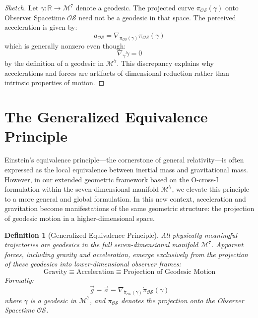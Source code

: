 \documentclass{article}
\newtheorem{definition}{Definition}
\begin{document}
\begin{proof}[Sketch]
Let $\gamma: \mathbb{R} \to \mathcal{M}^7$ denote a geodesic. The projected curve $\pi_{\mathcal{OS}}(\gamma)$ onto Observer Spacetime $\mathcal{OS}$ need not be a geodesic in that space. The perceived acceleration is given by:
\begin{equation}
a_{\mathcal{OS}} = \nabla_{\dot{\pi}_{\mathcal{OS}}(\gamma)}\dot{\pi}_{\mathcal{OS}}(\gamma)
\end{equation}
which is generally nonzero even though:
\begin{equation}
\nabla_{\dot{\gamma}}\dot{\gamma} = 0
\end{equation}
by the definition of a geodesic in $\mathcal{M}^7$. This discrepancy explains why accelerations and forces are artifacts of dimensional reduction rather than intrinsic properties of motion.
\end{proof}




\section{The Generalized Equivalence Principle}

Einstein's equivalence principle—the cornerstone of general relativity—is often expressed as the local equivalence between inertial mass and gravitational mass. However, in our extended geometric framework based on the O-cross-I formulation within the seven-dimensional manifold $\mathcal{M}^7$, we elevate this principle to a more general and global formulation. In this new context, acceleration and gravitation become manifestations of the same geometric structure: the projection of geodesic motion in a higher-dimensional space.

\begin{definition}[Generalized Equivalence Principle]
All physically meaningful trajectories are geodesics in the full seven-dimensional manifold $\mathcal{M}^7$. Apparent forces, including gravity and acceleration, emerge exclusively from the projection of these geodesics into lower-dimensional observer frames:
\begin{equation}
\text{Gravity} \equiv \text{Acceleration} \equiv \text{Projection of Geodesic Motion}
\end{equation}
Formally:
\begin{equation}
\vec{g} \equiv \vec{a} \equiv \nabla_{\dot{\pi}_{\mathcal{OS}}(\gamma)}\dot{\pi}_{\mathcal{OS}}(\gamma)
\end{equation}
where $\gamma$ is a geodesic in $\mathcal{M}^7$, and $\pi_{\mathcal{OS}}$ denotes the projection onto the Observer Spacetime $\mathcal{OS}$.
\end{definition}
\end{document}
